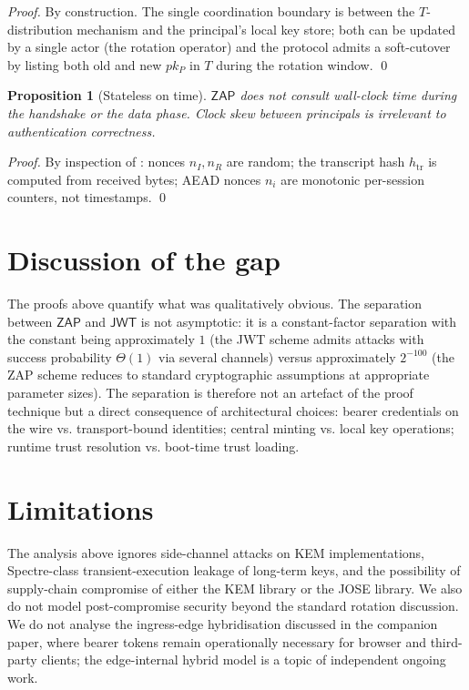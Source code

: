 \documentclass[11pt,a4paper]{article}
\theoremstyle{plain}
\newtheorem{proposition}[theorem]{Proposition}
\theoremstyle{definition}
\newcommand{\JWT}{\mathsf{JWT}}
\newcommand{\ZAP}{\mathsf{ZAP}}
\begin{document}
\begin{proof}
By construction. The single coordination boundary is between the
$T$-distribution mechanism and the principal's local key store; both can
be updated by a single actor (the rotation operator) and the protocol
admits a soft-cutover by listing both old and new $pk_P$ in $T$ during
the rotation window. \qed
\end{proof}

\begin{proposition}[Stateless on time]
\label{prop:time}
$\ZAP$ does not consult wall-clock time during the handshake or the data
phase. Clock skew between principals is irrelevant to authentication
correctness.
\end{proposition}

\begin{proof}
By inspection of : nonces $n_I, n_R$ are random; the
transcript hash $h_{\text{tr}}$ is computed from received bytes; AEAD
nonces $n_i$ are monotonic per-session counters, not timestamps. \qed
\end{proof}

\section{Discussion of the gap}

The proofs above quantify what was qualitatively obvious. The separation
between $\ZAP$ and $\JWT$ is not asymptotic: it is a constant-factor
separation with the constant being approximately $1$ (the JWT scheme
admits attacks with success probability $\Theta(1)$ via several channels)
versus approximately $2^{-100}$ (the ZAP scheme reduces to standard
cryptographic assumptions at appropriate parameter sizes). The
separation is therefore not an artefact of the proof technique but a
direct consequence of architectural choices: bearer credentials on the
wire vs. transport-bound identities; central minting vs. local key
operations; runtime trust resolution vs. boot-time trust loading.

\section{Limitations}

The analysis above ignores side-channel attacks on KEM implementations,
Spectre-class transient-execution leakage of long-term keys, and the
possibility of supply-chain compromise of either the KEM library or the
JOSE library. We also do not model post-compromise security beyond the
standard rotation discussion. We do not analyse the ingress-edge
hybridisation discussed in the companion paper, where bearer tokens
remain operationally necessary for browser and third-party clients; the
edge-internal hybrid model is a topic of independent ongoing work.
\end{document}

